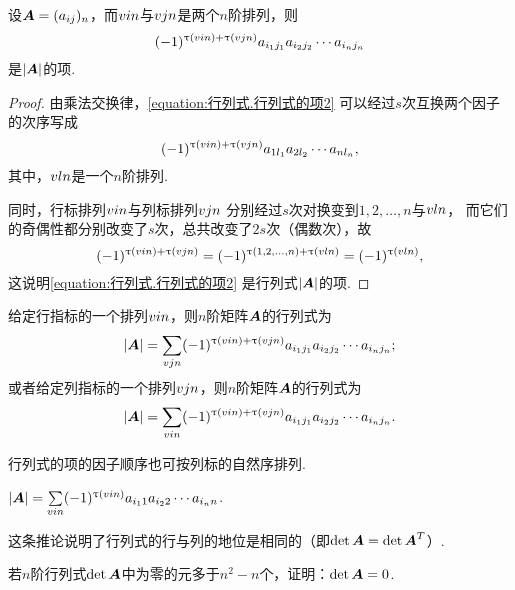 \begin{lemma}
设\(\boldsymbol{A}=(a_{ij})_n\)，而\(v{i}{n}\)与\(v{j}{n}\)是两个\(n\)阶排列，则
\begin{equation}\label{equation:行列式.行列式的项2}
	(-1)^{\uptau(v{i}{n})+\uptau(v{j}{n})}
	a_{i_1j_1} a_{i_2j_2} \dotsm a_{i_nj_n}
\end{equation}
是\(\abs{\boldsymbol{A}}\)的项.
\begin{proof}
由乘法交换律，\cref{equation:行列式.行列式的项2} 可以经过\(s\)次互换两个因子的次序写成\[
(-1)^{\uptau(v{i}{n})+\uptau(v{j}{n})}
	a_{1 l_1} a_{2 l_2} \dotsm a_{n l_n},
\]其中，\(v{l}{n}\)是一个\(n\)阶排列.

同时，行标排列\(v{i}{n}\)与列标排列\(v{j}{n}\)
分别经过\(s\)次对换变到\(1,2,\dotsc,n\)与\(v{l}{n}\)，
而它们的奇偶性都分别改变了\(s\)次，总共改变了\(2s\)次（偶数次），故\[
	(-1)^{\uptau(v{i}{n})+\uptau(v{j}{n})}
	= (-1)^{\uptau(1,2,\dotsc,n)+\uptau(v{l}{n})}
	= (-1)^{\uptau(v{l}{n})},
\]这说明\cref{equation:行列式.行列式的项2} 是行列式\(\abs{\boldsymbol{A}}\)的项.
\end{proof}
\end{lemma}

\begin{corollary}
给定行指标的一个排列\(v{i}{n}\)，则\(n\)阶矩阵\(\boldsymbol{A}\)的行列式为
\begin{equation}\label{equation:行列式.给定行指标排列下的行列式的完全展开式}
\abs{\boldsymbol{A}}
= \sum\limits_{v{j}{n}}
(-1)^{\uptau(v{i}{n})+\uptau(v{j}{n})}
a_{i_1 j_1} a_{i_2 j_2} \dotsm a_{i_n j_n};
\end{equation}
或者给定列指标的一个排列\(v{j}{n}\)，则\(n\)阶矩阵\(\boldsymbol{A}\)的行列式为
\begin{equation}\label{equation:行列式.给定列指标排列下的行列式的完全展开式}
	\abs{\boldsymbol{A}}
	= \sum\limits_{v{i}{n}}
	(-1)^{\uptau(v{i}{n})+\uptau(v{j}{n})}
	a_{i_1 j_1} a_{i_2 j_2} \dotsm a_{i_n j_n}.
\end{equation}
\end{corollary}

行列式的项的因子顺序也可按列标的自然序排列.
\begin{corollary}
\(\abs{\boldsymbol{A}} =
\sum\limits_{v{i}{n}}
(-1)^{\uptau(v{i}{n})} a_{i_1 1} a_{i_2 2} \dotsm a_{i_n n}\).
\end{corollary}
这条推论说明了行列式的行与列的地位是相同的（即\(\det\boldsymbol{A} = \det\boldsymbol{A}^T\)）.

\begin{example}
若\(n\)阶行列式\(\det\boldsymbol{A}\)中为零的元多于\(n^2-n\)个，证明：\(\det\boldsymbol{A}=0\).
\end{example}

